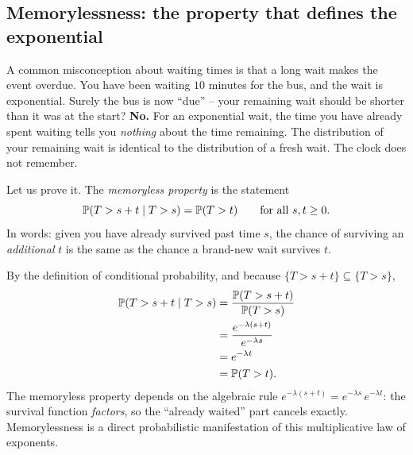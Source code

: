 \subsection{Memorylessness: the property that defines the exponential}
\label{ch11:memoryless}
\begin{trapbox}
A common misconception about waiting times is that a long wait makes the event overdue. You have been waiting $10$ minutes
for the bus, and the wait is exponential. Surely the bus is now ``due'' -- your
remaining wait should be shorter than it was at the start? \textbf{No.} For an
exponential wait, the time you have already spent waiting tells you
\emph{nothing} about the time remaining. The distribution of your remaining wait
is identical to the distribution of a fresh wait. The clock does not remember.
\end{trapbox}
Let us prove it. The \emph{memoryless property} is the statement
\[
  \operatorname{\mathbb{P}}(T > s + t \mid T > s) = \operatorname{\mathbb{P}}(T > t)
  \qquad \text{for all } s, t \ge 0.
\]
In words: given you have already survived past time $s$, the chance of surviving
an \emph{additional} $t$ is the same as the chance a brand-new wait survives $t$.
\begin{whybox}
By the definition of conditional probability, and
because $\{T > s+t\} \subseteq \{T > s\}$,
\begin{align*}
  \operatorname{\mathbb{P}}(T > s+t \mid T > s)
   &= \frac{\operatorname{\mathbb{P}}(T > s+t)}{\operatorname{\mathbb{P}}(T > s)} \\
   &= \frac{e^{-\lambda(s+t)}}{e^{-\lambda s}} \\
   &= e^{-\lambda t} \\
   &= \operatorname{\mathbb{P}}(T > t).
\end{align*}
The memoryless property depends on the algebraic rule $e^{-\lambda(s+t)} =
e^{-\lambda s}\,e^{-\lambda t}$: the survival function \emph{factors}, so the
``already waited'' part cancels exactly. Memorylessness is a direct probabilistic
manifestation of this multiplicative law of exponents.
\end{whybox}
